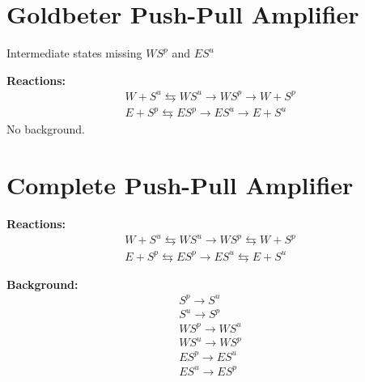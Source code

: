 \documentclass[aps,onecolumn,superscriptaddress,notitlepage]{revtex4-1}
\begin{document}
\section{Goldbeter Push-Pull Amplifier}

Intermediate states missing $WS^p$ and $ES^u$

\textbf{Reactions:}
\begin{gather}
W + S^u \leftrightarrows WS^u \rightarrow WS^p \rightarrow W + S^p\\
E + S^p \leftrightarrows ES^p \rightarrow ES^u \rightarrow E + S^u
\end{gather}
No background.

\section{Complete Push-Pull Amplifier}

\textbf{Reactions:}
\begin{gather}
W + S^u \leftrightarrows WS^u \rightarrow WS^p \leftrightarrows W + S^p\\
E + S^p \leftrightarrows ES^p \rightarrow ES^u \leftrightarrows E + S^u
\end{gather}

\textbf{Background:}
\begin{gather}
S^p \rightarrow S^u\\
S^u \rightarrow S^p\\
WS^p \rightarrow WS^u\\
WS^u \rightarrow WS^p\\
ES^p \rightarrow ES^u\\
ES^u \rightarrow ES^p
\end{gather}
\end{document}
